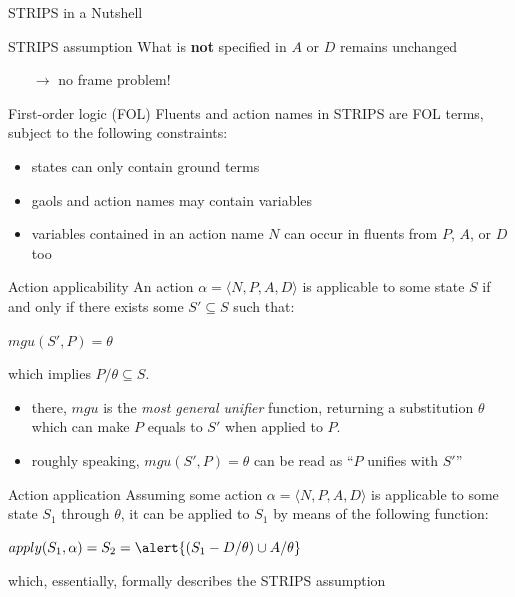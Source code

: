 \documentclass[presentation]{beamer}\mode<presentation>{\usetheme{AMSBolognaFC}}
\begin{document}
\begin{frame}[allowframebreaks]{STRIPS in a Nutshell}
\begin{alertblock}{STRIPS assumption}
	What is \textbf{not} specified in $A$ or $D$ remains unchanged
	\begin{itemize}
		\item[$\rightarrow$] no frame problem!
	\end{itemize}
\end{alertblock}

\begin{block}{First-order logic (FOL)}
	Fluents and action names in STRIPS are FOL \alert{terms}, subject to the following constraints:
	\begin{itemize}
		\item states can only contain \alert{ground} terms
		\item gaols and action names may contain \alert{variables}
		\item variables contained in an action name $N$ can occur in fluents from $P$, $A$, or $D$ too
	\end{itemize}
\end{block}

\framebreak

\begin{block}{Action applicability}
	An action $\alpha = \langle N, P, A, D \rangle$ is \alert{applicable} to some state $S$ if and only if there exists some $S' \subseteq S$ such that:
	\begin{center}
		$mgu(S', P) = \theta$
	\end{center}
	which implies $P / \theta \subseteq S$.
\end{block}
%
\begin{itemize}
	\item there, $mgu$ is the \emph{most general unifier} function, returning a substitution $\theta$ which can make $P$ equals to $S'$ when applied to $P$.
	\item roughly speaking, $mgu(S', P) = \theta$ can be read as ``$P$ unifies with $S'$''
\end{itemize}

\begin{block}{Action application}
	Assuming some action $\alpha = \langle N, P, A, D \rangle$ is applicable to some state $S_1$ through $\theta$, it can be applied to $S_1$ by means of the following function:
	\begin{center}
	 	$apply(S_1, \alpha) = S_2 = \alert{(S_1 - D / \theta) \cup A / \theta} $
	\end{center}
	which, essentially, formally describes the STRIPS assumption
\end{block}

\end{frame}
\end{document}
